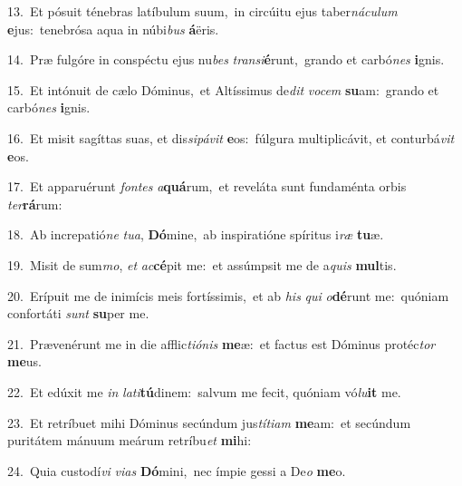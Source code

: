 {\numbfont\textcolor{\numbcolor}{13.}}~Et pósuit ténebras latíbulum suum,~\dagger in circúitu ejus taber\-\textit{ná}\-\textit{cu}\textit{lum} \textbf{e}\-jus:~\star tenebrósa aqua in núbi\textit{bus} \textbf{á}\-ëris.\par
{\numbfont\textcolor{\numbcolor}{14.}}~Præ fulgóre in conspéctu ejus nu\textit{bes} \textit{trans}\-\textit{i}\textbf{é}runt,~\star grando et carbó\textit{nes} \textbf{i}\-gnis.\par
{\numbfont\textcolor{\numbcolor}{15.}}~Et intónuit de cælo Dóminus,~\dagger et Altíssimus de\textit{dit} \textit{vo}\-\textit{cem} \textbf{su}\-am:~\star grando et carbó\textit{nes} \textbf{i}\-gnis.\par
{\numbfont\textcolor{\numbcolor}{16.}}~Et misit sagíttas suas, et dis\-\textit{si}\-\textit{pá}\textit{vit} \textbf{e}\-os:~\star fúlgura multiplicávit, et conturbá\textit{vit} \textbf{e}\-os.\par
{\numbfont\textcolor{\numbcolor}{17.}}~Et apparuérunt \textit{fon}\-\textit{tes} \textit{a}\-\textbf{quá}rum,~\star et reveláta sunt fundaménta orbis \textit{ter}\-\textbf{rá}rum:\par
{\numbfont\textcolor{\numbcolor}{18.}}~Ab increpatió\textit{ne} \textit{tu}\-\textit{a}, \textbf{Dó}\-mine,~\star ab inspiratióne spíritus i\textit{ræ} \textbf{tu}\-æ.\par
{\numbfont\textcolor{\numbcolor}{19.}}~Misit de sum\-\textit{mo}\-, \textit{et} \textit{ac}\-\textbf{cé}pit me:~\star et assúmpsit me de a\textit{quis} \textbf{mul}\-tis.\par
{\numbfont\textcolor{\numbcolor}{20.}}~Erípuit me de inimícis meis fortíssimis,~\dagger et ab \textit{his} \textit{qui} \textit{o}\-\textbf{dé}runt me:~\star quóniam confortáti \textit{sunt} \textbf{su}\-per me.\par
{\numbfont\textcolor{\numbcolor}{21.}}~Prævenérunt me in die afflic\-\textit{ti}\-\textit{ó}\textit{nis} \textbf{me}\-æ:~\star et factus est Dóminus protéc\textit{tor} \textbf{me}\-us.\par
{\numbfont\textcolor{\numbcolor}{22.}}~Et edúxit me \textit{in} \textit{la}\-\textit{ti}\textbf{tú}dinem:~\star salvum me fecit, quóniam vó\-\textit{lu}\-\textbf{it} me.\par
{\numbfont\textcolor{\numbcolor}{23.}}~Et retríbuet mihi Dóminus secúndum jus\-\textit{tí}\-\textit{ti}\textit{am} \textbf{me}\-am:~\star et secúndum puritátem mánuum meárum retríbu\textit{et} \textbf{mi}\-hi:\par
{\numbfont\textcolor{\numbcolor}{24.}}~Quia custodí\textit{vi} \textit{vi}\-\textit{as} \textbf{Dó}\-mini,~\star nec ímpie gessi a De\textit{o} \textbf{me}\-o.\par
